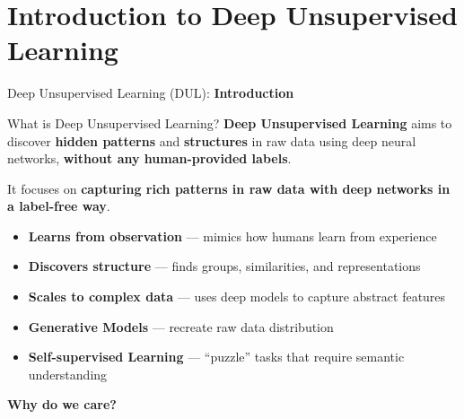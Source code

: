 \section{Introduction to Deep Unsupervised Learning}
\begin{frame}{}
    \LARGE Deep Unsupervised Learning (DUL): \textbf{Introduction}
\end{frame}

\begin{frame}{What is Deep Unsupervised Learning?}
    \textbf{Deep Unsupervised Learning} aims to discover \textbf{hidden patterns} and \textbf{structures} in raw data using deep neural networks, \textbf{without any human-provided labels}. 
    
    It focuses on \textbf{capturing rich patterns in raw data with deep networks in a label-free way}.
        \begin{itemize}
            \item \textbf{Learns from observation} --- mimics how humans learn from experience
            \item \textbf{Discovers structure} --- finds groups, similarities, and representations
            \item \textbf{Scales to complex data} --- uses deep models to capture abstract features
            \item \textbf{Generative Models} --- recreate raw data distribution
            \item \textbf{Self-supervised Learning} --- “puzzle” tasks that require semantic understanding
        \end{itemize}
        \vspace{0.5em}
        \centering
        {\Large \textbf{Why do we care?}}
\end{frame}

